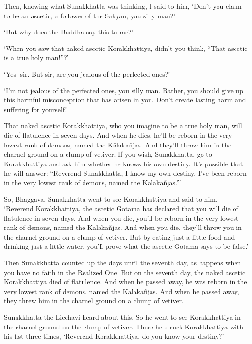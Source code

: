 \documentclass[12pt,openany]{book}%
\begin{document}
Then, knowing what Sunakkhatta was thinking, I said to him, ‘Don’t you claim to be an ascetic, a follower of the Sakyan, you silly man?’ 

‘But why does the Buddha say this to me?’ 

‘When you saw that naked ascetic Korakkhattiya, didn’t you think, “That ascetic is a true holy man!”?’ 

‘Yes, sir. But sir, are you jealous of the perfected ones?’ 

‘I’m not jealous of the perfected ones, you silly man. Rather, you should give up this harmful misconception that has arisen in you. Don’t create lasting harm and suffering for yourself! 

That naked ascetic Korakkhattiya, who you imagine to be a true holy man, will die of flatulence in seven days. And when he dies, he’ll be reborn in the very lowest rank of demons, named the \textsanskrit{Kālakañjas}. And they’ll throw him in the charnel ground on a clump of vetiver. If you wish, Sunakkhatta, go to Korakkhattiya and ask him whether he knows his own destiny. It’s possible that he will answer: “Reverend Sunakkhatta, I know my own destiny. I’ve been reborn in the very lowest rank of demons, named the \textsanskrit{Kālakañjas}.”’ 

So, Bhaggava, Sunakkhatta went to see Korakkhattiya and said to him, ‘Reverend Korakkhattiya, the ascetic Gotama has declared that you will die of flatulence in seven days. And when you die, you’ll be reborn in the very lowest rank of demons, named the \textsanskrit{Kālakañjas}. And when you die, they’ll throw you in the charnel ground on a clump of vetiver. But by eating just a little food and drinking just a little water, you’ll prove what the ascetic Gotama says to be false.’ 

Then Sunakkhatta counted up the days until the seventh day, as happens when you have no faith in the Realized One. But on the seventh day, the naked ascetic Korakkhattiya died of flatulence. And when he passed away, he was reborn in the very lowest rank of demons, named the \textsanskrit{Kālakañjas}. And when he passed away, they threw him in the charnel ground on a clump of vetiver. 

Sunakkhatta the Licchavi heard about this. So he went to see Korakkhattiya in the charnel ground on the clump of vetiver. There he struck Korakkhattiya with his fist three times, ‘Reverend Korakkhattiya, do you know your destiny?’ 
\end{document}
